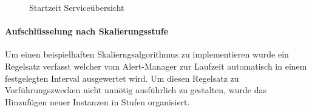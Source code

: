 \begin{figure}
  \centering
  \caption[Startzeit Container - Service]{Startzeit Serviceübersicht}
  \label{fig:specContainers}
\end{figure}


\paragraph{Aufschlüsselung nach Skalierungsstufe}
Um einen beispielhaften Skalierngsalgorithmus zu implementieren wurde ein Regelsatz verfasst welcher vom Alert-Manager zur Laufzeit automatisch in einem festgelegten Interval ausgewertet wird. Um diesen Regelsatz zu Vorführungszwecken nicht unnötig ausführlich zu gestalten, wurde das Hinzufügen neuer Instanzen in Stufen organisiert. 

